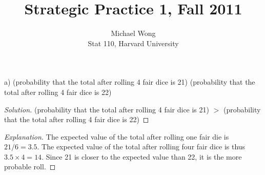 \documentclass[10pt]{article}
\newenvironment{problem}[2][Problem]{\begin{trivlist}
\item[\hskip \labelsep {\bfseries #1}\hskip \labelsep {\bfseries #2.}]}{\end{trivlist}}
\begin{document}
 
\title{Strategic Practice 1, Fall 2011}
\author{Michael Wong\\
Stat 110, Harvard University}
\maketitle
 
\begin{problem}{1}
(a) (probability that the total after rolling 4 fair dice is 21) \underline{\hspace{1cm}}
(probability that the total after rolling 4 fair dice is 22)
\end{problem}

\begin{proof}[Solution]

(probability that the total after rolling 4 fair dice is 21) $>$
(probability that the total after rolling 4 fair dice is 22)
\end{proof}

\begin{proof}[Explanation]

The expected value of the total after rolling one fair die is $21 / 6 = 3.5$. The expected value of the total after rolling four fair dice is thus $3.5 \times 4 = 14$. Since 21 is closer to the expected value than 22, it is the more probable roll.
\end{proof}
\end{document}
